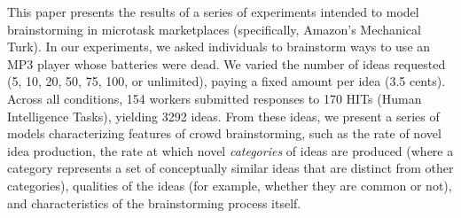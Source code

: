 


This paper presents the results of a series of experiments intended to model brainstorming in microtask marketplaces (specifically, Amazon's Mechanical Turk). In our experiments, we asked individuals to brainstorm ways to use an MP3 player whose batteries were dead. We varied the number of ideas requested (5, 10, 20, 50, 75, 100, or unlimited), paying a fixed amount per idea (3.5 cents). Across all conditions, 154 workers submitted responses to 170 HITs (Human Intelligence Tasks), yielding 3292 ideas. From these ideas, we present a series of models characterizing features of crowd brainstorming, such as the rate of novel idea production, the rate at which novel {\em categories\/} of ideas are produced (where a category represents a set of conceptually similar ideas that are distinct from other categories), qualities of the ideas (for example, whether they are common or not), and characteristics of the brainstorming process itself.

